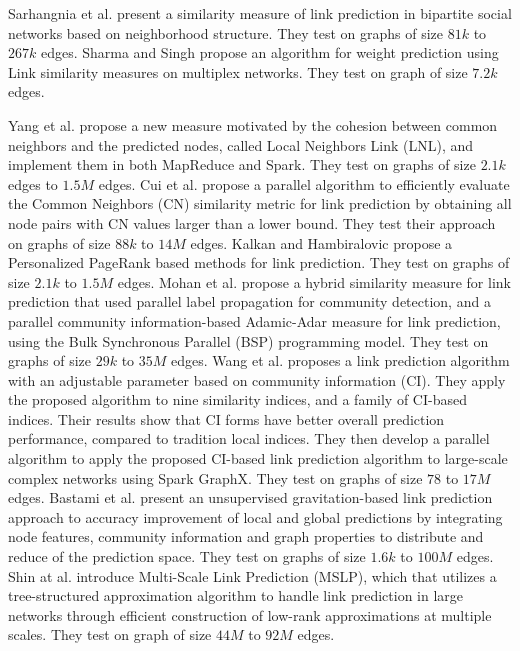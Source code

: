 Sarhangnia et al. \cite{sarhangnia2022novel} present a similarity measure of link prediction in bipartite social networks based on neighborhood structure. They test on graphs of size $81k$ to $267k$ edges.
Sharma and Singh \cite{sharma2016efficient} propose an algorithm for weight prediction using Link similarity measures on multiplex networks. They test on graph of size $7.2k$ edges.


Yang et al. \cite{yang2015new} propose a new measure motivated by the cohesion between common neighbors and the predicted nodes, called Local Neighbors Link (LNL), and implement them in both MapReduce and Spark. They test on graphs of size $2.1k$ edges to $1.5M$ edges.
Cui et al. \cite{cui2016bounded} propose a parallel algorithm to efficiently evaluate the Common Neighbors (CN) similarity metric for link prediction by obtaining all node pairs with CN values larger than a lower bound. They test their approach on graphs of size $88k$ to $14M$ edges.
Kalkan and Hambiralovic \cite{kalkanfinding} propose a Personalized PageRank based methods for link prediction. They test on graphs of size $2.1k$ to $1.5M$ edges.
Mohan et al. \cite{mohan2017scalable} propose a hybrid similarity measure for link prediction that used parallel label propagation for community detection, and a parallel community information-based Adamic-Adar measure for link prediction, using the Bulk Synchronous Parallel (BSP) programming model. They test on graphs of size $29k$ to $35M$ edges.
Wang et al. \cite{wang2019link} proposes a link prediction algorithm with an adjustable parameter based on community information (CI). They apply the proposed algorithm to nine similarity indices, and a family of CI-based indices. Their results show that CI forms have better overall prediction performance, compared to tradition local indices. They then develop a parallel algorithm to apply the proposed CI-based link prediction algorithm to large-scale complex networks using Spark GraphX. They test on graphs of size $78$ to $17M$ edges.
Bastami et al. \cite{bastami2019gravitation} present an unsupervised gravitation-based link prediction approach to accuracy improvement of local and global predictions by integrating node features, community information and graph properties to distribute and reduce of the prediction space. They test on graphs of size $1.6k$ to $100M$ edges.
Shin at al. \cite{shin2012multi} introduce Multi-Scale Link Prediction (MSLP), which that utilizes a tree-structured approximation algorithm to handle link prediction in large networks through efficient construction of low-rank approximations at multiple scales. They test on graph of size $44M$ to $92M$ edges.
